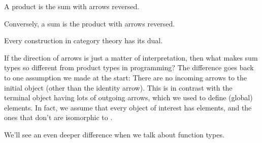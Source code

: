 \documentclass[DaoFP]{subfiles}
\begin{document}
A product is the sum with arrows reversed. 

Conversely, a sum is the product with arrows reversed. 

\medskip

Every construction in category theory has its dual.

\medskip

If the direction of arrows is just a matter of interpretation, then what makes sum types so different from product types in programming? The difference goes back to one assumption we made at the start: There are no incoming arrows to the initial object (other than the identity arrow). This is in contrast with the terminal object having lots of outgoing arrows, which we used to define (global) elements. In fact, we assume that every object of interest has elements, and the ones that don't are isomorphic to . 

We'll see an even deeper difference when we talk about function types.
\end{document}
